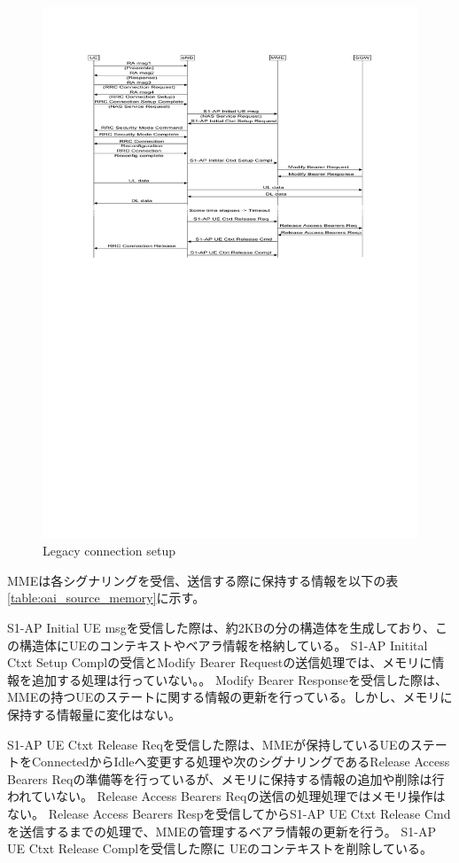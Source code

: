 \documentclass[a4j]{ujarticle}
\begin{document}
\begin{figure}[htbp]
  \centering
  \includegraphics[width=0.9\hsize]{Legacy_connection_setup.pdf}
  \caption{Legacy connection setup}
  \label{Legacy_connection_setup}
\end{figure}

\clearpage
MMEは各シグナリングを受信、送信する際に保持する情報を以下の表\ref{table:oai_source_memory}に示す。

S1-AP Initial UE msgを受信した際は、約2KBの分の構造体を生成しており、この構造体にUEのコンテキストやベアラ情報を格納している。
S1-AP Initital Ctxt Setup Complの受信とModify Bearer Requestの送信処理では、メモリに情報を追加する処理は行っていない。。
Modify Bearer Responseを受信した際は、MMEの持つUEのステートに関する情報の更新を行っている。しかし、メモリに保持する情報量に変化はない。


S1-AP UE Ctxt Release Reqを受信した際は、MMEが保持しているUEのステートをConnectedからIdleへ変更する処理や次のシグナリングであるRelease Access Bearers Reqの準備等を行っているが、メモリに保持する情報の追加や削除は行われていない。
Release Access Bearers Reqの送信の処理処理ではメモリ操作はない。
Release Access Bearers Respを受信してからS1-AP UE Ctxt Release Cmdを送信するまでの処理で、MMEの管理するベアラ情報の更新を行う。
S1-AP UE Ctxt Release Complを受信した際に UEのコンテキストを削除している。
\end{document}

